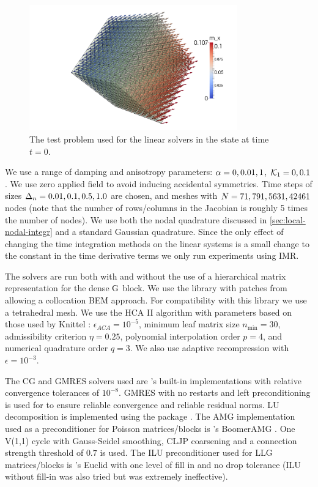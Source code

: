 \begin{figure}
  \centering
  \includegraphics[width=0.8\textwidth]{images/itsacube}
  \caption{The test problem used for the linear solvers in the state at time $t=0$.}
  \label{fig:cube-initial-condition}
\end{figure}


We use a range of damping and anisotropy parameters: $\alpha = 0, 0.01, 1$, $\mathcal{K}_1 = 0, 0.1$.
We use zero applied field to avoid inducing accidental symmetries.
Time steps of sizes $\Delta_{n} = 0.01, 0.1, 0.5, 1.0$ are chosen, and meshes with $N= 71, 791, 5631, 42461$ nodes (note that the number of rows/columns in the Jacobian is roughly 5 times the number of nodes).
We use both the nodal quadrature discussed in \cref{sec:local-nodal-integr} and a standard Gaussian quadrature.
Since the only effect of changing the time integration methods on the linear systems is a small change to the constant in the time derivative terms we only run experiments using IMR.

The solvers are run both with and without the use of a hierarchical matrix representation for the dense $\mathrm{G}$ block.
We use the \hlib library \cite{hlib-website} with patches from \nmag \cite{nmag-website} allowing a collocation BEM approach.
For compatibility with this library we use a tetrahedral mesh.
We use the HCA II algorithm with parameters based on those used by Knittel \cite{Knittel2011}:
$\epsilon_{ACA} = 10^{-5}$,
minimum leaf matrix size $n_{\text{min}}= 30$,
admissibility criterion $\eta = 0.25$,
polynomial interpolation order $p=4$, and
numerical quadrature order $q=3$.
We also use adaptive recompression with $\epsilon = 10^{-3}$.

The CG and GMRES solvers used are \oomph's built-in implementations with relative convergence tolerances of $10^{-8}$.
GMRES with no restarts and left preconditioning is used for to ensure reliable convergence and reliable residual norms.
LU decomposition is implemented using the \superlu package \cite{superlu}.
The AMG implementation used as a preconditioner for Poisson matrices/blocks is \hypre's BoomerAMG \cite{hypre}.
One V(1,1) cycle with Gauss-Seidel smoothing, CLJP coarsening and a connection strength threshold of $0.7$ is used.
The ILU preconditioner used for LLG matrices/blocks is \hypre's Euclid with one level of fill in and no drop tolerance (ILU without fill-in was also tried but was extremely ineffective).


